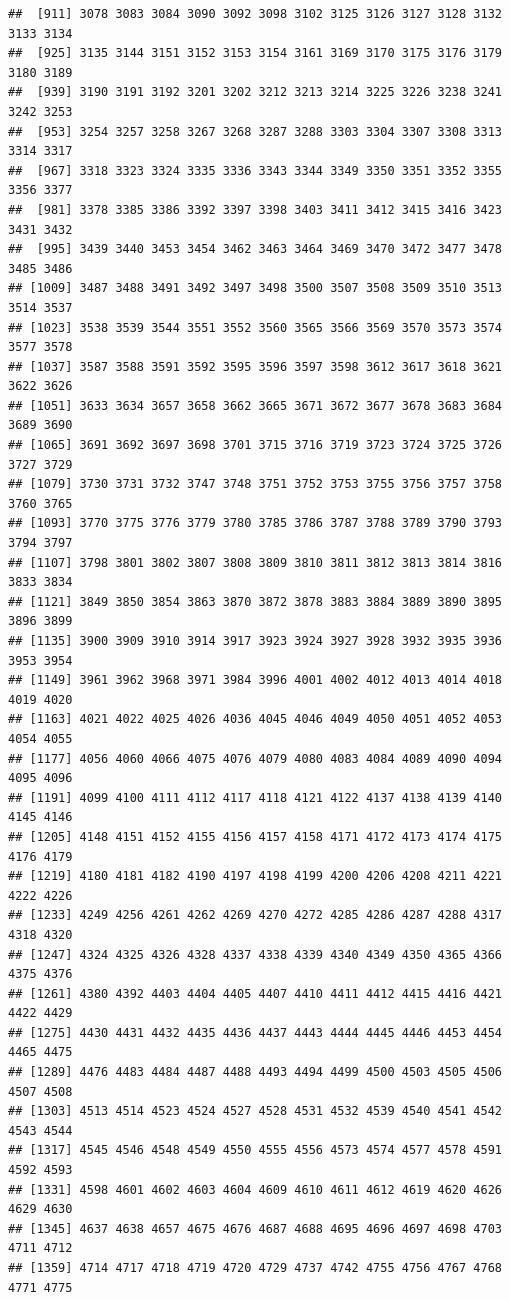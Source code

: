\documentclass[]{article}
\begin{document}
\begin{verbatim}
##  [911] 3078 3083 3084 3090 3092 3098 3102 3125 3126 3127 3128 3132 3133 3134
##  [925] 3135 3144 3151 3152 3153 3154 3161 3169 3170 3175 3176 3179 3180 3189
##  [939] 3190 3191 3192 3201 3202 3212 3213 3214 3225 3226 3238 3241 3242 3253
##  [953] 3254 3257 3258 3267 3268 3287 3288 3303 3304 3307 3308 3313 3314 3317
##  [967] 3318 3323 3324 3335 3336 3343 3344 3349 3350 3351 3352 3355 3356 3377
##  [981] 3378 3385 3386 3392 3397 3398 3403 3411 3412 3415 3416 3423 3431 3432
##  [995] 3439 3440 3453 3454 3462 3463 3464 3469 3470 3472 3477 3478 3485 3486
## [1009] 3487 3488 3491 3492 3497 3498 3500 3507 3508 3509 3510 3513 3514 3537
## [1023] 3538 3539 3544 3551 3552 3560 3565 3566 3569 3570 3573 3574 3577 3578
## [1037] 3587 3588 3591 3592 3595 3596 3597 3598 3612 3617 3618 3621 3622 3626
## [1051] 3633 3634 3657 3658 3662 3665 3671 3672 3677 3678 3683 3684 3689 3690
## [1065] 3691 3692 3697 3698 3701 3715 3716 3719 3723 3724 3725 3726 3727 3729
## [1079] 3730 3731 3732 3747 3748 3751 3752 3753 3755 3756 3757 3758 3760 3765
## [1093] 3770 3775 3776 3779 3780 3785 3786 3787 3788 3789 3790 3793 3794 3797
## [1107] 3798 3801 3802 3807 3808 3809 3810 3811 3812 3813 3814 3816 3833 3834
## [1121] 3849 3850 3854 3863 3870 3872 3878 3883 3884 3889 3890 3895 3896 3899
## [1135] 3900 3909 3910 3914 3917 3923 3924 3927 3928 3932 3935 3936 3953 3954
## [1149] 3961 3962 3968 3971 3984 3996 4001 4002 4012 4013 4014 4018 4019 4020
## [1163] 4021 4022 4025 4026 4036 4045 4046 4049 4050 4051 4052 4053 4054 4055
## [1177] 4056 4060 4066 4075 4076 4079 4080 4083 4084 4089 4090 4094 4095 4096
## [1191] 4099 4100 4111 4112 4117 4118 4121 4122 4137 4138 4139 4140 4145 4146
## [1205] 4148 4151 4152 4155 4156 4157 4158 4171 4172 4173 4174 4175 4176 4179
## [1219] 4180 4181 4182 4190 4197 4198 4199 4200 4206 4208 4211 4221 4222 4226
## [1233] 4249 4256 4261 4262 4269 4270 4272 4285 4286 4287 4288 4317 4318 4320
## [1247] 4324 4325 4326 4328 4337 4338 4339 4340 4349 4350 4365 4366 4375 4376
## [1261] 4380 4392 4403 4404 4405 4407 4410 4411 4412 4415 4416 4421 4422 4429
## [1275] 4430 4431 4432 4435 4436 4437 4443 4444 4445 4446 4453 4454 4465 4475
## [1289] 4476 4483 4484 4487 4488 4493 4494 4499 4500 4503 4505 4506 4507 4508
## [1303] 4513 4514 4523 4524 4527 4528 4531 4532 4539 4540 4541 4542 4543 4544
## [1317] 4545 4546 4548 4549 4550 4555 4556 4573 4574 4577 4578 4591 4592 4593
## [1331] 4598 4601 4602 4603 4604 4609 4610 4611 4612 4619 4620 4626 4629 4630
## [1345] 4637 4638 4657 4675 4676 4687 4688 4695 4696 4697 4698 4703 4711 4712
## [1359] 4714 4717 4718 4719 4720 4729 4737 4742 4755 4756 4767 4768 4771 4775

\end{verbatim}
\end{document}
